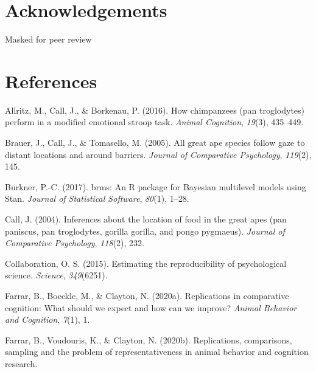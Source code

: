 \documentclass[10pt, letterpaper]{article}
\begin{document}
\hypertarget{acknowledgements}{%
\section{Acknowledgements}\label{acknowledgements}}

Masked for peer review

\hypertarget{references}{%
\section{References}\label{references}}

\setlength{\parindent}{-0.1in} 
\setlength{\leftskip}{0.125in}

\noindent

\hypertarget{refs}{}
\leavevmode\hypertarget{ref-allritz2016chimpanzees}{}%
Allritz, M., Call, J., \& Borkenau, P. (2016). How chimpanzees (pan
troglodytes) perform in a modified emotional stroop task. \emph{Animal
Cognition}, \emph{19}(3), 435--449.

\leavevmode\hypertarget{ref-brauer2005all}{}%
Brauer, J., Call, J., \& Tomasello, M. (2005). All great ape species
follow gaze to distant locations and around barriers. \emph{Journal of
Comparative Psychology}, \emph{119}(2), 145.

\leavevmode\hypertarget{ref-R-brms_a}{}%
Burkner, P.-C. (2017). brms: An R package for Bayesian multilevel models
using Stan. \emph{Journal of Statistical Software}, \emph{80}(1), 1--28.

\leavevmode\hypertarget{ref-call2004inferences}{}%
Call, J. (2004). Inferences about the location of food in the great apes
(pan paniscus, pan troglodytes, gorilla gorilla, and pongo pygmaeus).
\emph{Journal of Comparative Psychology}, \emph{118}(2), 232.

\leavevmode\hypertarget{ref-open2015estimating}{}%
Collaboration, O. S. (2015). Estimating the reproducibility of
psychological science. \emph{Science}, \emph{349}(6251).

\leavevmode\hypertarget{ref-farrar2020replicomp}{}%
Farrar, B., Boeckle, M., \& Clayton, N. (2020a). Replications in
comparative cognition: What should we expect and how can we improve?
\emph{Animal Behavior and Cognition}, \emph{7}(1), 1.

\leavevmode\hypertarget{ref-farrar2020replications}{}%
Farrar, B., Voudouris, K., \& Clayton, N. (2020b). Replications,
comparisons, sampling and the problem of representativeness in animal
behavior and cognition research.
\end{document}

